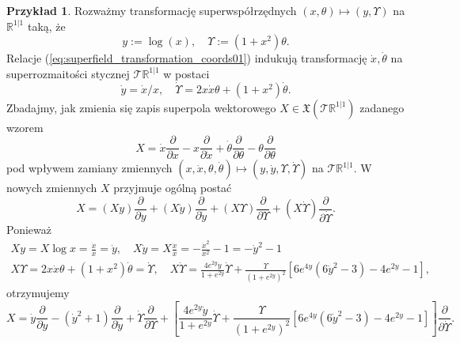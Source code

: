 \documentclass[11pt,a4paper]{report}
\theoremstyle{definition}
\newtheorem{example}[theorem]{Przykład}
\begin{document}
\begin{example} 
	Rozważmy transformację superwspółrzędnych $(x, \theta) \mapsto (y, \Upsilon)$ na $\mathbb{R}^{1|1}$ taką, że
	\begin{equation}
		\label{eq:superfield_transformation_coords01}
		y:= \log (x), \quad \Upsilon := (1+x^2) \theta.
	\end{equation}
	Relacje (\ref{eq:superfield_transformation_coords01}) indukują transformację $\dot x, \dot \theta$ na superrozmaitości stycznej $\mathcal{T} \mathbb{R}^{1|1}$ w postaci 
	\begin{equation}
		\label{eq:superfield_transformation_coords02}
		\dot y=\dot x/x,\quad \dot \Upsilon=2x\dot x\theta+(1+x^2)\dot \theta.
	\end{equation}
	Zbadajmy, jak zmienia się zapis superpola wektorowego $X \in \mathfrak{X}(\mathcal{T} \mathbb{R}^{1|1})$ zadanego wzorem
	\begin{equation}
		\label{eq:the_x_equation}
		X=\dot x\frac{\partial}{\partial x}-x\frac{\partial}{\partial \dot x}+\dot\theta\frac{\partial}{\partial \theta}-\theta\frac{\partial}{\partial \theta}
	\end{equation}
	pod wpływem zamiany zmiennych $(x, \dot x, \theta, \dot \theta) \mapsto (y, \dot y, \Upsilon, \dot \Upsilon)$ na $\mathcal{T}\mathbb{R}^{1|1}$. W nowych zmiennych $X$ przyjmuje ogólną postać
	\begin{equation*}
		X=(Xy)\frac{\partial}{\partial y}+(X\dot y)\frac{\partial}{\partial \dot y}+(X\Upsilon)\frac{\partial}{\partial \Upsilon}+(X\dot \Upsilon)\frac{\partial}{\partial \dot\Upsilon}.
	\end{equation*}
	Ponieważ
	\begin{equation*}
		\begin{gathered}
			Xy=X\log x=\frac{\dot x}{x}=\dot y,\quad X\dot y=X\frac{\dot x}{x}=-\frac{\dot x^2}{x^2}-1=-\dot y^2-1 \\
			X\Upsilon=2x\dot x\theta+(1+x^2)\dot\theta =\dot \Upsilon, \quad X\dot\Upsilon=\frac{4e^{2y}\dot y}{1+e^{2y}}\dot\Upsilon +\frac{\Upsilon}{(1+e^{2y})^2}[6e^{4y}(6\dot y^2-3)-4e^{2y}-1],
		\end{gathered}
	\end{equation*}
	otrzymujemy
	\begin{equation*}
		X=\dot y\frac{\partial}{\partial y}-(\dot y^2+1)\frac{\partial }{\partial \dot y}+\dot\Upsilon\frac{\partial}{\partial \Upsilon}+\left[\frac{4e^{2y}\dot y}{1+e^{2y}}\dot\Upsilon +\frac{\Upsilon}{(1+e^{2y})^2}[6e^{4y}(6\dot y^2-3)-4e^{2y}-1]\right]\frac{\partial}{\partial \dot\Upsilon}.
	\end{equation*}
\end{example}
		      			
\end{document}
